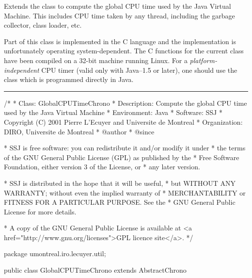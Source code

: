 
Extends the   class to compute the global CPU time used
by the Java Virtual Machine. This includes CPU time taken by any thread,
including the garbage collector, class loader, etc.

Part of this class is implemented in the C language and the 
implementation is unfortunately operating system-dependent.
The C functions for the current class have been compiled on a 32-bit machine
running Linux. %
For a {\em platform-independent} CPU timer (valid only with Java--1.5 or later),
 one should use the class  which is programmed 
directly in Java.

\bigskip\hrule
\begin{code}
\begin{hide}
/*
 * Class:        GlobalCPUTimeChrono
 * Description:  Compute the global CPU time used by the Java Virtual Machine
 * Environment:  Java
 * Software:     SSJ 
 * Copyright (C) 2001  Pierre L'Ecuyer and Universite de Montreal
 * Organization: DIRO, Universite de Montreal
 * @author       
 * @since

 * SSJ is free software: you can redistribute it and/or modify it under
 * the terms of the GNU General Public License (GPL) as published by the
 * Free Software Foundation, either version 3 of the License, or
 * any later version.

 * SSJ is distributed in the hope that it will be useful,
 * but WITHOUT ANY WARRANTY; without even the implied warranty of
 * MERCHANTABILITY or FITNESS FOR A PARTICULAR PURPOSE.  See the
 * GNU General Public License for more details.

 * A copy of the GNU General Public License is available at
   <a href="http://www.gnu.org/licenses">GPL licence site</a>.
 */
\end{hide}
package umontreal.iro.lecuyer.util;


public class GlobalCPUTimeChrono extends AbstractChrono\begin{hide} {
   
   private static boolean ssjUtilLoaded = false;
   private static native void Heure (long[] tab);

   protected void getTime (long[] tab) {
      if (!ssjUtilLoaded) {
         // We cannot load the library in a static block
         // since the subclass ChronoSingleThread does not
         // need the native method.
         System.loadLibrary ("ssjutil");

         ssjUtilLoaded = true;
      }
      
      Heure (tab);
   }
\end{hide}
\end{code}

